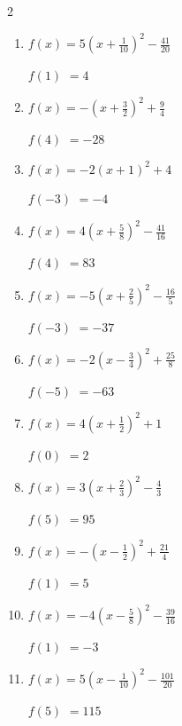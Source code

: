 \begin{multicols}{2}
\begin{enumerate}
$f(0)$
        $=-4$

  \item $\displaystyle f(x)=5\left( x+\frac{1}{10}\right)^{2}-\frac{41}{20}$

$f(1)$
        $=4$

  \item $\displaystyle f(x)=-\left( x+\frac{3}{2}\right)^{2}+\frac{9}{4}$

$f(4)$
        $=-28$

  \item $\displaystyle f(x)=-2\left( x+1\right)^{2}+4$

$f(-3)$
        $=-4$

  \item $\displaystyle f(x)=4\left( x+\frac{5}{8}\right)^{2}-\frac{41}{16}$

$f(4)$
        $=83$

\columnbreak %

  \item $\displaystyle f(x)=-5\left( x+\frac{2}{5}\right)^{2}-\frac{16}{5}$

$f(-3)$
        $=-37$

  \item $\displaystyle f(x)=-2\left( x-\frac{3}{4}\right)^{2}+\frac{25}{8}$

$f(-5)$
        $=-63$

  \item $\displaystyle f(x)=4\left( x+\frac{1}{2}\right)^{2}+1$

$f(0)$
        $=2$

  \item $\displaystyle f(x)=3\left( x+\frac{2}{3}\right)^{2}-\frac{4}{3}$

$f(5)$
        $=95$

  \item $\displaystyle f(x)=-\left( x-\frac{1}{2}\right)^{2}+\frac{21}{4}$

$f(1)$
        $=5$

\columnbreak %

\resetques

  \item $\displaystyle f(x)=-4\left( x-\frac{5}{8}\right)^{2}-\frac{39}{16}$

$f(1)$
        $=-3$

  \item $\displaystyle f(x)=5\left( x-\frac{1}{10}\right)^{2}-\frac{101}{20}$

$f(5)$
        $=115$


\end{enumerate}
\end{multicols}
